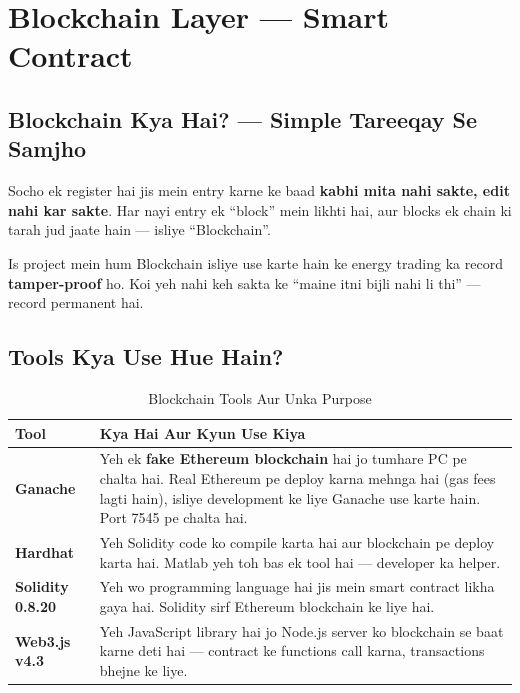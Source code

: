 \chapter{Blockchain Layer --- Smart Contract}

\section{Blockchain Kya Hai? --- Simple Tareeqay Se Samjho}

\begin{conceptbox}[Blockchain = Permanent Record Book]
Socho ek register hai jis mein entry karne ke baad \textbf{kabhi mita nahi sakte, edit nahi kar sakte}. Har nayi entry ek ``block'' mein likhti hai, aur blocks ek chain ki tarah jud jaate hain --- isliye ``Blockchain''.

Is project mein hum Blockchain isliye use karte hain ke energy trading ka record \textbf{tamper-proof} ho. Koi yeh nahi keh sakta ke ``maine itni bijli nahi li thi'' --- record permanent hai.
\end{conceptbox}

\section{Tools Kya Use Hue Hain?}

\begin{table}[H]
\centering
\begin{tabularx}{\textwidth}{l X}
\toprule
\textbf{Tool} & \textbf{Kya Hai Aur Kyun Use Kiya} \\
\midrule
\textbf{Ganache} & Yeh ek \textbf{fake Ethereum blockchain} hai jo tumhare PC pe chalta hai. Real Ethereum pe deploy karna mehnga hai (gas fees lagti hain), isliye development ke liye Ganache use karte hain. Port 7545 pe chalta hai. \\
\textbf{Hardhat} & Yeh Solidity code ko compile karta hai aur blockchain pe deploy karta hai. Matlab yeh toh bas ek tool hai --- developer ka helper. \\
\textbf{Solidity 0.8.20} & Yeh wo programming language hai jis mein smart contract likha gaya hai. Solidity sirf Ethereum blockchain ke liye hai. \\
\textbf{Web3.js v4.3} & Yeh JavaScript library hai jo Node.js server ko blockchain se baat karne deti hai --- contract ke functions call karna, transactions bhejne ke liye. \\
\bottomrule
\end{tabularx}
\caption{Blockchain Tools Aur Unka Purpose}
\end{table}

